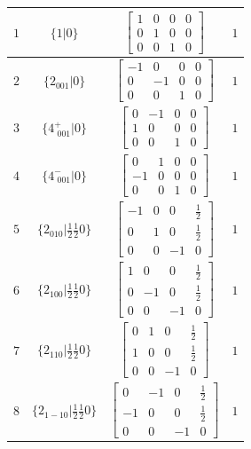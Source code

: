 \documentclass[fleqn,8pt]{jsarticle}
\begin{document}
\begin{longtable}{cccc}
$ 1 $ & $ \{1|0\} $ & $ \begin{bmatrix} 1 & 0 & 0 & 0 \\ 0 & 1 & 0 & 0 \\ 0 & 0 & 1 & 0 \end{bmatrix} $ & $ 1 $ \\ \hline
$ 2 $ & $ \{2{}_{001}|0\} $ & $ \begin{bmatrix} -1 & 0 & 0 & 0 \\ 0 & -1 & 0 & 0 \\ 0 & 0 & 1 & 0 \end{bmatrix} $ & $ 1 $ \\ \hline
$ 3 $ & $ \{4^{+}_{\,\,001}|0\} $ & $ \begin{bmatrix} 0 & -1 & 0 & 0 \\ 1 & 0 & 0 & 0 \\ 0 & 0 & 1 & 0 \end{bmatrix} $ & $ 1 $ \\ \hline
$ 4 $ & $ \{4^{-}_{\,\,001}|0\} $ & $ \begin{bmatrix} 0 & 1 & 0 & 0 \\ -1 & 0 & 0 & 0 \\ 0 & 0 & 1 & 0 \end{bmatrix} $ & $ 1 $ \\ \hline
$ 5 $ & $ \{2{}_{010}|\frac{1}{2} \frac{1}{2} 0\} $ & $ \begin{bmatrix} -1 & 0 & 0 & \frac{1}{2} \\ 0 & 1 & 0 & \frac{1}{2} \\ 0 & 0 & -1 & 0 \end{bmatrix} $ & $ 1 $ \\ \hline
$ 6 $ & $ \{2{}_{100}|\frac{1}{2} \frac{1}{2} 0\} $ & $ \begin{bmatrix} 1 & 0 & 0 & \frac{1}{2} \\ 0 & -1 & 0 & \frac{1}{2} \\ 0 & 0 & -1 & 0 \end{bmatrix} $ & $ 1 $ \\ \hline
$ 7 $ & $ \{2{}_{110}|\frac{1}{2} \frac{1}{2} 0\} $ & $ \begin{bmatrix} 0 & 1 & 0 & \frac{1}{2} \\ 1 & 0 & 0 & \frac{1}{2} \\ 0 & 0 & -1 & 0 \end{bmatrix} $ & $ 1 $ \\ \hline
$ 8 $ & $ \{2{}_{1-10}|\frac{1}{2} \frac{1}{2} 0\} $ & $ \begin{bmatrix} 0 & -1 & 0 & \frac{1}{2} \\ -1 & 0 & 0 & \frac{1}{2} \\ 0 & 0 & -1 & 0 \end{bmatrix} $ & $ 1 $ \\ \hline

\end{longtable}
\end{document}
